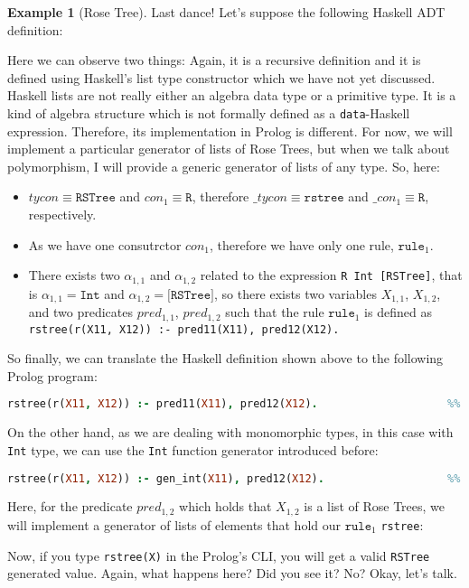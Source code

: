 \documentclass{report}
\theoremstyle{definition}
\newtheorem{example}{Example}[section]
\theoremstyle{definition}
\newcommand{\ttt}[1]{\texttt{#1}}
\begin{document}
\begin{example}[Rose Tree]
	Last dance! Let's suppose the following Haskell ADT definition:
	
	Here we can observe two things: Again, it is a recursive definition and it is defined using Haskell's list type constructor which we have not yet discussed. \\
				
	Haskell lists are not really either an algebra data type or a primitive type. It is a kind of algebra structure which is not formally defined as a \ttt{data}-Haskell expression. Therefore, its implementation in Prolog is different. For now, we will implement a particular generator of lists of Rose Trees, but when we talk about polymorphism, I will provide a generic generator of lists of any type. So, here:
	\begin{itemize}
		\item $tycon \equiv \ttt{RSTree}$ and $con_1 \equiv \ttt{R}$, therefore $\_tycon \equiv \ttt{rstree}$ and $\_con_1 \equiv \ttt{R}$, respectively.
		\item As we have one consutrctor $con_1$, therefore we have only one rule, $\ttt{rule}_1$.
		\item There exists two $\alpha_{1,1}$ and $\alpha_{1,2}$ related to the expression \ttt{R Int [RSTree]}, that is $\alpha_{1,1} = \ttt{Int}$ and $\alpha_{1,2} = \ttt{[RSTree]}$, so there exists two variables $X_{1,1}$, $X_{1,2}$, and two predicates $pred_{1,1}$, $pred_{1,2}$ such that the rule $\ttt{rule}_1$ is defined as \\ \ttt{rstree(r(X11, X12)) :- pred11(X11), pred12(X12).}
	\end{itemize}
	So finally, we can translate the Haskell definition shown above to the following Prolog program:\\
	\begin{lstlisting}[language=Prolog]
rstree(r(X11, X12)) :- pred11(X11), pred12(X12).					%% rule 1
	\end{lstlisting}
	On the other hand, as we are dealing with monomorphic types, in this case with \ttt{Int} type, we can use the \ttt{Int} function generator introduced before:\\
	\begin{lstlisting}[language=Prolog]
rstree(r(X11, X12)) :- gen_int(X11), pred12(X12).					%% rule 1
	\end{lstlisting}
	Here, for the predicate $pred_{1,2}$ which holds that $X_{1,2}$ is a list of Rose Trees, we will implement a generator of lists of elements that hold our $\ttt{rule}_1$ \ttt{rstree}:
	
	Now, if you type \ttt{rstree(X)} in the Prolog's CLI, you will get a valid \ttt{RSTree} generated value. Again, what happens here? Did you see it? No? Okay, let's talk.\\
\end{example}
\end{document}
